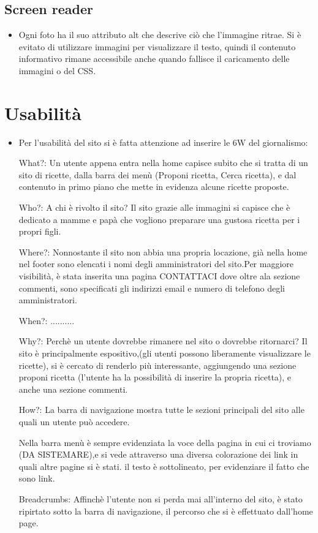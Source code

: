 \documentclass[12pt]{article}
\begin{document}
			\subsection{Screen reader}
			\begin{itemize}
				\item Ogni foto ha il suo attributo alt che descrive ciò che l'immagine ritrae.
				Si è evitato di utilizzare immagini per visualizzare il testo, quindi il contenuto informativo rimane accessibile anche quando fallisce il caricamento delle immagini o del CSS.
			\end{itemize}
			\section{Usabilit\`a}
			\begin{itemize}
				\item Per l'usabilit\`a del sito si è fatta attenzione ad inserire le 6W del giornalismo:
				
				What?: Un utente appena entra nella home capisce subito che si tratta di un sito di ricette, dalla barra dei menù (Proponi ricetta, Cerca ricetta), e dal contenuto in primo piano che mette in evidenza alcune ricette proposte.
				
				Who?: A chi è rivolto il sito? Il sito grazie alle immagini si capisce che è dedicato a mamme e pap\`a
				che vogliono preparare una gustosa ricetta per i propri figli.
				
				Where?: Nonnostante il sito non abbia una propria locazione, già nella home nel footer sono elencati i nomi degli amministratori del sito.Per maggiore visibilit\`a, è stata inserita una pagina CONTATTACI dove oltre ala sezione commenti, sono specificati gli indirizzi email e numero di telefono degli amministratori. 
				
				When?: ..........
				
				Why?: Perchè un utente dovrebbe rimanere nel sito o dovrebbe ritornarci? Il sito è principalmente espositivo,(gli utenti possono liberamente visualizzare le ricette), si è cercato di renderlo più interessante, aggiungendo una sezione proponi ricetta (l'utente ha la possibilità di inserire la propria ricetta), e anche una sezione commenti.
				
				How?: La barra di navigazione mostra tutte le sezioni principali del sito alle quali un utente può accedere.
				
				Nella barra menù è sempre evidenziata la voce della pagina in cui ci troviamo (DA SISTEMARE),e si vede attraverso una diversa colorazione dei link in quali altre pagine si è stati. il testo è sottolineato, per evidenziare il fatto che sono link.
				
				Breadcrumbs: Affinchè l'utente non si perda mai all'interno del sito, è stato ripirtato sotto la barra di navigazione, il percorso che si è effettuato dall'home page.
				
			\end{itemize}
\end{document}
